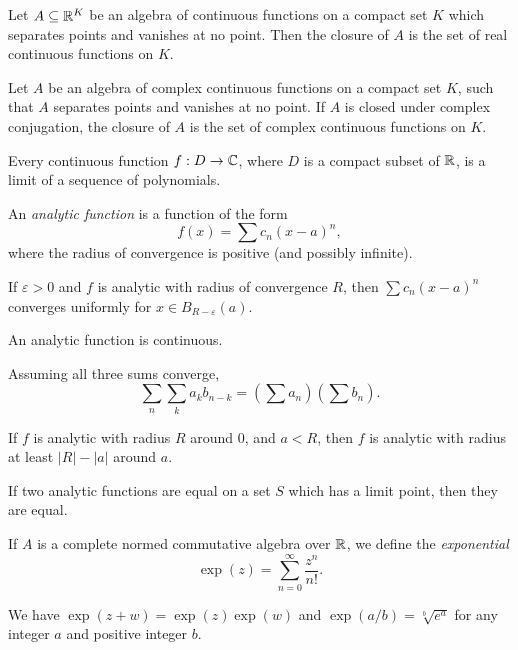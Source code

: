\begin{thm}
    Let $A\subseteq \mathbb{R}^K$ be an algebra of continuous functions on a
    compact set $K$ which separates points and vanishes at no point. Then the
    closure of $A$ is the set of real continuous functions on $K$.
\end{thm}
\begin{cor}
    Let $A$ be an algebra of complex continuous functions
    on a compact set $K$, such that $A$ separates points and vanishes at no
    point. If $A$ is closed under complex conjugation, the closure of $A$ is the
    set of complex continuous functions on $K$.
\end{cor}
\begin{cor}[Weierstrass]
    Every continuous function $f:D\to\mathbb{C}$, where $D$ is a compact subset of
    $\mathbb{R}$, is a limit of a sequence of polynomials.
\end{cor}
\begin{defn}
    An \emph{analytic function} is a function of the form \[f(x)=\sum c_n
    (x-a)^n,\] where the radius of convergence is positive (and possibly
    infinite).
\end{defn}
\begin{prop}
    If $\varepsilon>0$ and $f$ is analytic with radius of convergence $R$, then
    $\sum c_n (x-a)^n$ converges uniformly for $x\in B_{R-\varepsilon}(a)$.
\end{prop}
\begin{thm}[Abel]
    An analytic function is continuous.
\end{thm}
\begin{cor}
    Assuming all three sums converge,
    \[\sum_n\sum_k a_k b_{n-k}=\left(\sum a_n\right)\left(\sum b_n\right).\]
\end{cor}
\begin{thm}[Taylor]
    If $f$ is analytic with radius $R$ around $0$, and $a<R$, then $f$ is
    analytic with radius at least $|R|-|a|$ around $a$.
\end{thm}
\begin{prop}
    If two analytic functions are equal on a set $S$ which
    has a limit point, then they are equal.
\end{prop}
\begin{defn}
    If $A$ is a complete normed commutative algebra over $\mathbb{R}$, we define the \emph{exponential}
    \[\exp(z)=\sum_{n=0}^\infty\frac{z^n}{n!}.\]
\end{defn}
\begin{prop}
    We have $\exp(z+w)=\exp(z)\exp(w)$
    and $\exp(a/b)=\sqrt[b]{e^a}$ for any integer $a$ and positive integer $b$.
\end{prop}
